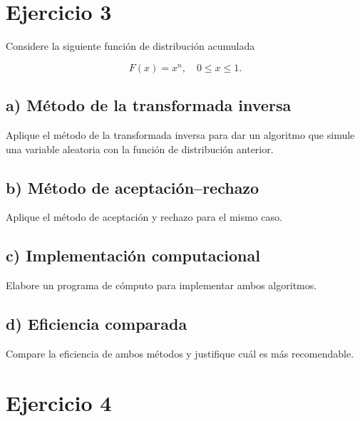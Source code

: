 \documentclass[10pt,a4paper]{article}
\let\le\leqslant
\let\leq\leqslant
\let\le\leq
\let\oldsection\section
\renewcommand{\section}{%
      \clearpage
      \thispagestyle{myfancy}%
      \oldsection
    }
\begin{document}
    \hypertarget{ejercicio-3}{%
\section{Ejercicio 3}\label{ejercicio-3}}

    Considere la siguiente función de distribución acumulada

\[
F(x) = x^{n},\quad 0 \le x \le 1.
\]

    \hypertarget{a-muxe9todo-de-la-transformada-inversa}{%
\subsection{a) Método de la transformada
inversa}\label{a-muxe9todo-de-la-transformada-inversa}}

    Aplique el método de la transformada inversa para dar un algoritmo que
simule una variable aleatoria con la función de distribución anterior.

    \hypertarget{b-muxe9todo-de-aceptaciuxf3nrechazo}{%
\subsection{b) Método de
aceptación--rechazo}\label{b-muxe9todo-de-aceptaciuxf3nrechazo}}

    Aplique el método de aceptación y rechazo para el mismo caso.

    \hypertarget{c-implementaciuxf3n-computacional}{%
\subsection{c) Implementación
computacional}\label{c-implementaciuxf3n-computacional}}

    Elabore un programa de cómputo para implementar ambos algoritmos.

    \hypertarget{d-eficiencia-comparada}{%
\subsection{d) Eficiencia comparada}\label{d-eficiencia-comparada}}

    Compare la eficiencia de ambos métodos y justifique cuál es más
recomendable.

    \hypertarget{ejercicio-4}{%
\section{Ejercicio 4}\label{ejercicio-4}}
\end{document}
